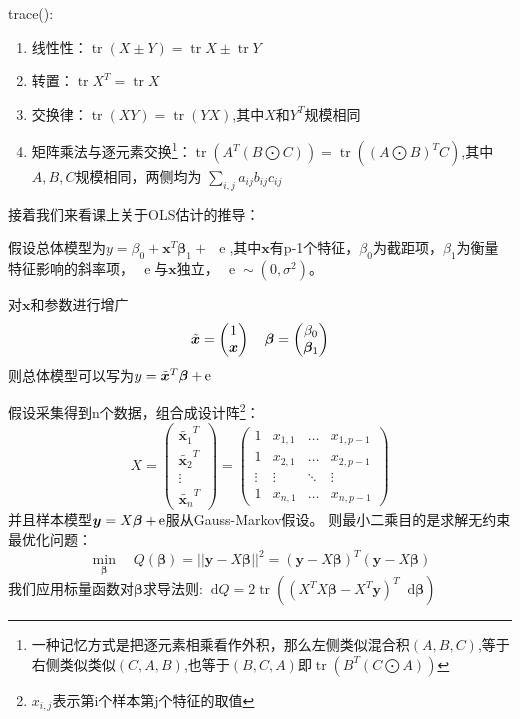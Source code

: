 \documentclass[cn,hazy,green,12pt,normal]{elegantnote}
\DeclareMathOperator{\e}{\!\!\;\mathrm e}
\DeclareMathOperator{\tr}{tr}
\renewcommand{\d}{\mathop{}\!\mathrm{d}}
\numberwithin{equation}{section}
\numberwithin{subsection}{section}
\begin{document}
trace():
\begin{enumerate}
    \item 线性性：$\tr(X \pm Y)=\tr X \pm \tr Y$
    \item 转置：$\tr X^T = \tr X$
    \item 交换律：$\tr (XY)=\tr (YX)$,其中$X$和$Y^T$规模相同
    \item 矩阵乘法与逐元素交换\footnote{一种记忆方式是把逐元素相乘看作外积，那么左侧类似混合积$(A,B,C)$,等于右侧类似类似$(C,A,B)$,也等于$(B,C,A)$即$\tr (B^T(C\bigodot A))$}：$\tr (A^T(B \bigodot C)) = \tr ((A \bigodot B)^T C)$,其中$A,B,C$规模相同，两侧均为 $\sum_{i,j} a_{ij}b_{ij}c_{ij}$
\end{enumerate}
接着我们来看课上关于OLS估计的推导：

假设总体模型为$y=\beta_0 + \bm x^T \bm \beta_1 + \e$,其中$\bm x$有p-1个特征，$\beta_0 $为截距项，$\beta_1$为衡量特征影响的斜率项，$\e$与$\bm x$独立，$\e \sim (0,\sigma^2)$。

对$\bm x$和参数进行增广
\begin{equation*}
\Tilde{\bm x}=\begin{pmatrix}
    1\\
\bm x
    \end{pmatrix}\quad
 \bm \beta = \begin{pmatrix}
        \beta_0\\
        \bm \beta_1
    \end{pmatrix}  
\end{equation*}
则总体模型可以写为$y = \Tilde{\bm x} ^T \bm \beta +\e$

假设采集得到n个数据，组合成设计阵\footnote{$x_{i,j}$表示第i个样本第j个特征的取值}：
\[
X = \begin{pmatrix}
    \tilde{\bm x_1}^T \\
    \tilde{\bm x_2}^T \\
    \vdots \\
    \tilde{\bm x_n}^T
\end{pmatrix}=\begin{pmatrix}
    1 & x_{1,1} & \dotsc &x_{1,p-1}\\
    1 & x_{2,1} & \dotsc &x_{2,p-1}\\
    \vdots & \vdots & \ddots & \vdots \\
    1 & x_{n,1} & \dotsc &x_{n,p-1}
\end{pmatrix}
\]
并且样本模型$\bm y = X\bm \beta +\bm \e$服从Gauss-Markov假设。
则最小二乘目的是求解无约束最优化问题：
\[
\min_{\bm \beta} \quad Q(\bm \beta) = ||\bm y -X \bm \beta||^2 =(\bm y - X\bm \beta)^T(\bm y - X\bm \beta)
\]
我们应用标量函数对$\bm \beta$求导法则:$\d Q = 2\tr ((X^T X\bm \beta-X^T \bm y)^T\d \bm \beta)$
\end{document}
